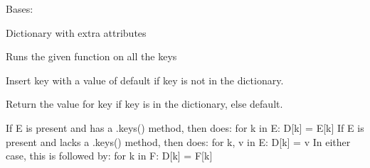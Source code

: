 \documentclass[letterpaper,10pt,english]{sphinxmanual}
\begin{document}
\begin{fulllineitems}
\label{\detokenize{api/pymusepipe:pymusepipe.target_sample.PipeDict}}
\pysigstartsignatures
{}
\pysigstopsignatures
\sphinxAtStartPar
Bases: 

\sphinxAtStartPar
Dictionary with extra attributes

\begin{fulllineitems}
\label{\detokenize{api/pymusepipe:pymusepipe.target_sample.PipeDict.run_on_all_keys}}
\pysigstartsignatures
{}
\pysigstopsignatures
\sphinxAtStartPar
Runs the given function on all the keys

\end{fulllineitems}


\begin{fulllineitems}
\label{\detokenize{api/pymusepipe:pymusepipe.target_sample.PipeDict.setdefault}}
\pysigstartsignatures
{}
\pysigstopsignatures
\sphinxAtStartPar
Insert key with a value of default if key is not in the dictionary.

\sphinxAtStartPar
Return the value for key if key is in the dictionary, else default.

\end{fulllineitems}


\begin{fulllineitems}
\label{\detokenize{api/pymusepipe:pymusepipe.target_sample.PipeDict.update}}
\pysigstartsignatures
{}
\pysigstopsignatures
\sphinxAtStartPar
If E is present and has a .keys() method, then does:  for k in E: D{[}k{]} = E{[}k{]}
If E is present and lacks a .keys() method, then does:  for k, v in E: D{[}k{]} = v
In either case, this is followed by: for k in F:  D{[}k{]} = F{[}k{]}

\end{fulllineitems}


\end{fulllineitems}
\end{document}
